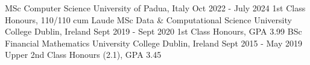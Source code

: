 
\begin{cveducationentries}
    \cveducationentry
      {MSc Computer Science}
      {University of Padua, Italy}
      {Oct 2022 - July 2024}
      {1st Class Honours, 110/110 cum Laude}
    \cveducationentry
      {MSc Data \& Computational Science}
      {University College Dublin, Ireland}
      {Sept 2019 - Sept 2020}
      {1st Class Honours, GPA 3.99}
    \cveducationentry
      {BSc Financial Mathematics}
      {University College Dublin, Ireland}
      {Sept 2015 - May 2019}
      {Upper 2nd Class Honours (2.1), GPA 3.45}
\end{cveducationentries}
